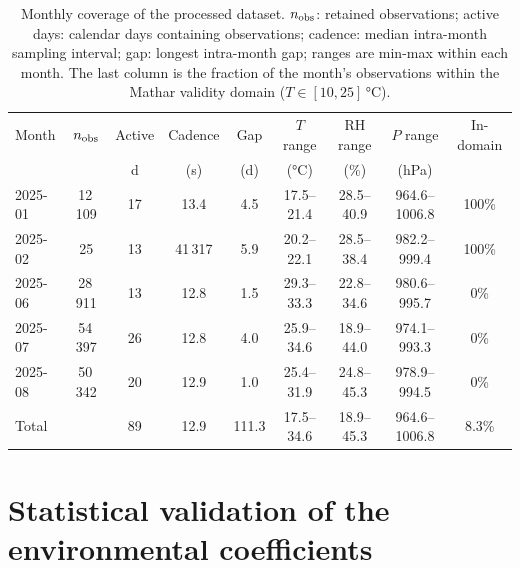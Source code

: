 \documentclass[aps,prapplied,reprint,superscriptaddress]{revtex4-2}
\begin{document}
\begin{table}[tbp]
\centering
\caption{Monthly coverage of the processed dataset. $n_{\rm obs}$: retained observations; active days: calendar days containing observations; cadence: median intra-month sampling interval; gap: longest intra-month gap; ranges are min-max within each month. The last column is the fraction of the month's
observations within the Mathar validity domain ($T \in [10,25]\,\si{\celsius}$).}
\label{tab:S0}
\begin{tabular}{lcccccccc}
\hline
Month & $n_{\rm obs}$ & Active & Cadence & Gap & $T$ range & RH range & $P$ range & In-domain \\
  & & \si{\day}   & (\si{\second}) & (\si{\day})  & (\si{\celsius}) & (\si{\percent}) & (\si{\hecto\pascal}) & \\
\hline
2025-01 & 12\,109 & 17 & 13.4 & 4.5 & 17.5--21.4 & 28.5--40.9 & 964.6--1006.8 & 100\% \\
2025-02 & 25 & 13 & 41\,317 & 5.9 & 20.2--22.1 & 28.5--38.4 & 982.2--999.4 & 100\% \\
2025-06 & 28\,911 & 13 & 12.8 & 1.5 & 29.3--33.3 & 22.8--34.6 & 980.6--995.7 & 0\% \\
2025-07 & 54\,397 & 26 & 12.8 & 4.0 & 25.9--34.6 & 18.9--44.0 & 974.1--993.3 & 0\% \\
2025-08 & 50\,342 & 20 & 12.9 & 1.0 & 25.4--31.9 & 24.8--45.3 & 978.9--994.5 & 0\% \\
\hline
\multicolumn{2}{l}{Total} & 89 & 12.9 & 111.3 & 17.5--34.6 & 18.9--45.3 & 964.6--1006.8 & 8.3\% \\
\hline
\end{tabular}
\end{table}

\section{Statistical validation of the environmental coefficients}
\label{sec:S1}
\end{document}
